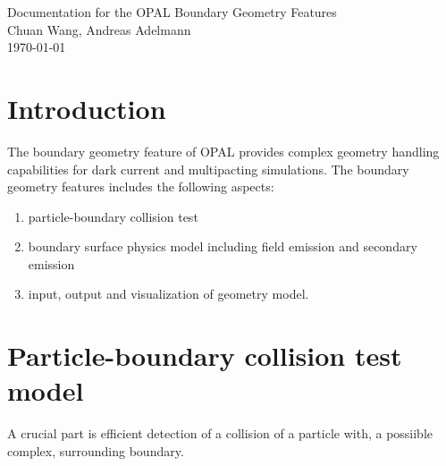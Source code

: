 \documentclass[a4paper,11pt]{article}
\begin{document}
\begin{center}
{\large Documentation for the OPAL Boundary Geometry Features} \\
Chuan Wang, Andreas Adelmann \\
\today\\
\end{center}
\section{Introduction}
The boundary geometry feature of OPAL \cite{OP} provides complex geometry handling capabilities for dark current and multipacting simulations. The boundary geometry features includes the following aspects:
\begin{enumerate}
\item particle-boundary collision test 
\item boundary surface physics model including field emission and secondary emission
\item input, output and visualization of geometry model.
\end{enumerate}
\section{Particle-boundary collision test model}
A crucial part is efficient detection of a collision of a particle with, a possiible complex, surrounding boundary. 
\end{document}
